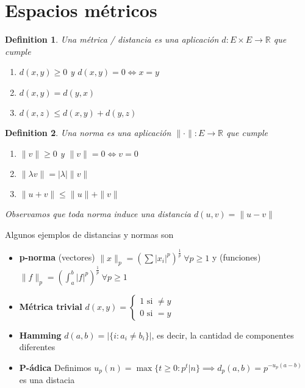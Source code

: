 \documentclass{myclass}
\newtheorem*{definition}{Definition}
\begin{document}
\section{Espacios métricos}
\begin{definition}
Una métrica / distancia es una aplicación $d:E\times E\to \mathbb{R}$ que cumple
\begin{enumerate}[topsep=-6pt, itemsep=0pt]
  \item $d(x, y)\ge 0$ y $d(x, y)=0 \iff x=y$
  \item $d(x, y)=d(y, x)$
  \item $d(x, z) \le d(x, y) + d(y, z)$
\end{enumerate}
\end{definition}

\begin{definition}
Una norma es una aplicación $\|\cdot \|: E\to \mathbb{R}$ que cumple
\begin{enumerate}[topsep=-6pt, itemsep=0pt]
  \item $\|v\|\ge 0$ y $\|v\|=0 \iff v=0$
  \item $\|\lambda v\| =  |\lambda |\|v\|$
  \item  $\|u+v\|\le  \|u\|+\|v\|$
\end{enumerate}
Observamos que toda norma induce una distancia $d(u, v)=\|u-v\|$
\end{definition}

Algunos ejemplos de distancias y normas son
\begin{itemize}[topsep=-6pt, itemsep=0pt]
  \item \textbf{p-norma} (vectores) $\displaystyle\|x\|_p = \left(\sum |x_i|^p\right)^{\frac{1}{p}} \ \forall p\ge 1$ y (funciones) $\displaystyle\|f\|_p = \left(\int_a^b |f|^p\right)^{\frac{1}{p}} \ \forall p\ge 1$
  \item \textbf{Métrica trivial} $d(x, y) = \begin{cases}
    1 \text{ si } \neq  y\\
    0 \text{ si } = y
  \end{cases}$   
  \item \textbf{Hamming} $d(a, b)=|\{i:a_i\neq b_i\}|$, es decir, la cantidad de componentes diferentes
  \item \textbf{P-ádica} Definimos $u_p(n) = \max\{t\ge 0:p^t|n\}\implies d_p(a, b) = p^{-u_p(a-b)}$ es una distacia
\end{itemize}
\end{document}
